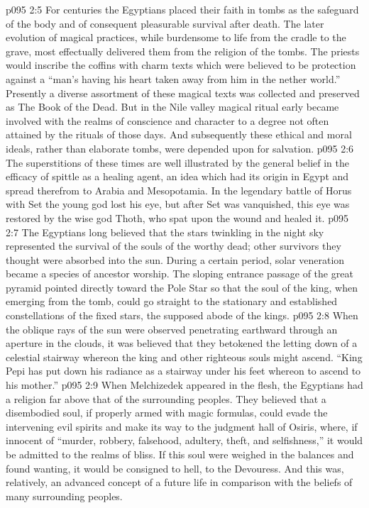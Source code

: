 \vs p095 2:5 For centuries the Egyptians placed their faith in tombs as the safeguard of the body and of consequent pleasurable survival after death. The later evolution of magical practices, while burdensome to life from the cradle to the grave, most effectually delivered them from the religion of the tombs. The priests would inscribe the coffins with charm texts which were believed to be protection against a “man’s having his heart taken away from him in the nether world.” Presently a diverse assortment of these magical texts was collected and preserved as The Book of the Dead. But in the Nile valley magical ritual early became involved with the realms of conscience and character to a degree not often attained by the rituals of those days. And subsequently these ethical and moral ideals, rather than elaborate tombs, were depended upon for salvation.
\vs p095 2:6 \pc The superstitions of these times are well illustrated by the general belief in the efficacy of spittle as a healing agent, an idea which had its origin in Egypt and spread therefrom to Arabia and Mesopotamia. In the legendary battle of Horus with Set the young god lost his eye, but after Set was vanquished, this eye was restored by the wise god Thoth, who spat upon the wound and healed it.
\vs p095 2:7 \pc The Egyptians long believed that the stars twinkling in the night sky represented the survival of the souls of the worthy dead; other survivors they thought were absorbed into the sun. During a certain period, solar veneration became a species of ancestor worship. The sloping entrance passage of the great pyramid pointed directly toward the Pole Star so that the soul of the king, when emerging from the tomb, could go straight to the stationary and established constellations of the fixed stars, the supposed abode of the kings.
\vs p095 2:8 When the oblique rays of the sun were observed penetrating earthward through an aperture in the clouds, it was believed that they betokened the letting down of a celestial stairway whereon the king and other righteous souls might ascend. “King Pepi has put down his radiance as a stairway under his feet whereon to ascend to his mother.”
\vs p095 2:9 When Melchizedek appeared in the flesh, the Egyptians had a religion far above that of the surrounding peoples. They believed that a disembodied soul, if properly armed with magic formulas, could evade the intervening evil spirits and make its way to the judgment hall of Osiris, where, if innocent of “murder, robbery, falsehood, adultery, theft, and selfishness,” it would be admitted to the realms of bliss. If this soul were weighed in the balances and found wanting, it would be consigned to hell, to the Devouress. And this was, relatively, an advanced concept of a future life in comparison with the beliefs of many surrounding peoples.
